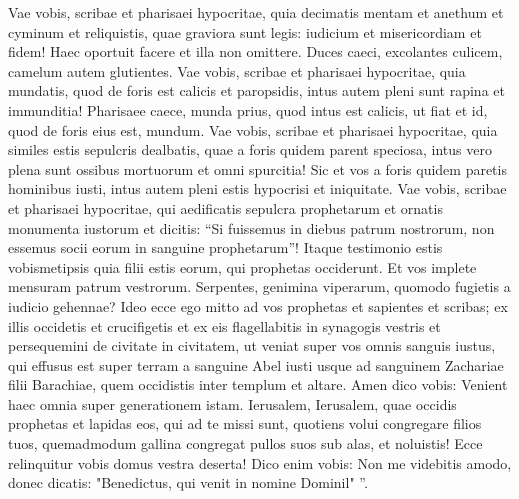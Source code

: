 \begin{biblechapter}
\begin{biblechapter}
\begin{biblechapter}
\begin{biblechapter}
\begin{biblechapter}
\begin{biblechapter}
\begin{biblechapter}
\begin{biblechapter}
\begin{biblechapter}
\begin{biblechapter}
\begin{biblechapter}
\begin{biblechapter}
\begin{biblechapter}
\begin{biblechapter}
\begin{biblechapter}
\begin{biblechapter}
\begin{biblechapter}
\begin{biblechapter}
\begin{biblechapter}
\begin{biblechapter}
\begin{biblechapter}
\begin{biblechapter}
\begin{biblechapter}
 \verse Vae vobis, scribae et pharisaei hypocritae, quia decimatis mentam et anethum et cyminum et reliquistis, quae graviora sunt legis: iudicium et misericordiam et fidem! Haec oportuit facere et illa non omittere. 
\verse Duces caeci, excolantes culicem, camelum autem glutientes.
 \verse Vae vobis, scribae et pharisaei hypocritae, quia mundatis, quod de foris est calicis et paropsidis, intus autem pleni sunt rapina et immunditia! 
\verse Pharisaee caece, munda prius, quod intus est calicis, ut fiat et id, quod de foris eius est, mundum.
 \verse Vae vobis, scribae et pharisaei hypocritae, quia similes estis sepulcris dealbatis, quae a foris quidem parent speciosa, intus vero plena sunt ossibus mortuorum et omni spurcitia! 
\verse Sic et vos a foris quidem paretis hominibus iusti, intus autem pleni estis hypocrisi et iniquitate.
 \verse Vae vobis, scribae et pharisaei hypocritae, qui aedificatis sepulcra prophetarum et ornatis monumenta iustorum 
\verse et dicitis: “Si fuissemus in diebus patrum nostrorum, non essemus socii eorum in sanguine prophetarum”! 
 \verse Itaque testimonio estis vobismetipsis quia filii estis eorum, qui prophetas occiderunt. 
\verse Et vos implete mensuram patrum vestrorum. 
\verse Serpentes, genimina viperarum, quomodo fugietis a iudicio gehennae? 
\verse Ideo ecce ego mitto ad vos prophetas et sapientes et scribas; ex illis occidetis et crucifigetis et ex eis flagellabitis in synagogis vestris et persequemini de civitate in civitatem, 
\verse ut veniat super vos omnis sanguis iustus, qui effusus est super terram a sanguine Abel iusti usque ad sanguinem Zachariae filii Barachiae, quem occidistis inter templum et altare. 
\verse Amen dico vobis: Venient haec omnia super generationem istam.
 \verse Ierusalem, Ierusalem, quae occidis prophetas et lapidas eos, qui ad te missi sunt, quotiens volui congregare filios tuos, quemadmodum gallina congregat pullos suos sub alas, et noluistis! 
\verse Ecce relinquitur vobis domus vestra deserta! 
\verse Dico enim vobis: Non me videbitis amodo, donec dicatis: "Benedictus, qui venit in nomine Dominil" ”.
 

\end{biblechapter}
\end{biblechapter}
\end{biblechapter}
\end{biblechapter}
\end{biblechapter}
\end{biblechapter}
\end{biblechapter}
\end{biblechapter}
\end{biblechapter}
\end{biblechapter}
\end{biblechapter}
\end{biblechapter}
\end{biblechapter}
\end{biblechapter}
\end{biblechapter}
\end{biblechapter}
\end{biblechapter}
\end{biblechapter}
\end{biblechapter}
\end{biblechapter}
\end{biblechapter}
\end{biblechapter}
\end{biblechapter}

